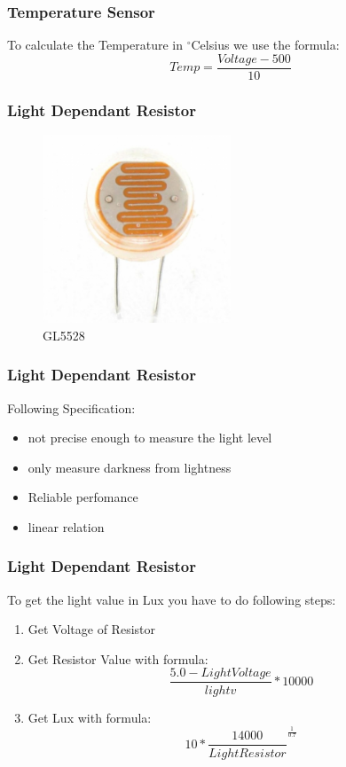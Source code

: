 \documentclass{beamer}
\begin{document}
\frame
{
	\frametitle{Temperature Sensor}
	To calculate the Temperature in $^{\circ}$Celsius we use the formula:\\
	\begin{equation*}
	Temp = \frac{Voltage - 500}{10} 
	\end{equation*}
}

\frame
{
	\frametitle{Light Dependant Resistor}
		\begin{figure}[h!]
  		\centering
    	\includegraphics[width=0.5\textwidth]{../Images/Light.jpg}
		\caption{GL5528}
	\end{figure}
}

\frame
{
	\frametitle{Light Dependant Resistor}
	Following Specification:
	\begin{itemize}
	\item not precise enough to measure the light level
	\item only measure darkness from lightness
	\item Reliable perfomance
	\item linear relation
	\end{itemize}
}

\frame
{
	\frametitle{Light Dependant Resistor}
	To get the light value in Lux you have to do following steps:
	\begin{enumerate}
	\item Get Voltage of Resistor
	\item Get Resistor Value with formula:
	\begin{equation*}
		\frac{5.0 - Light Voltage}{lightv} * 10000
	\end{equation*}
	\item Get Lux with formula:
	\begin{equation*}
		10*\frac{14000}{Light Resistor}^\frac{1}{0.7}
	\end{equation*}
	\end{enumerate}
}
\end{document}
